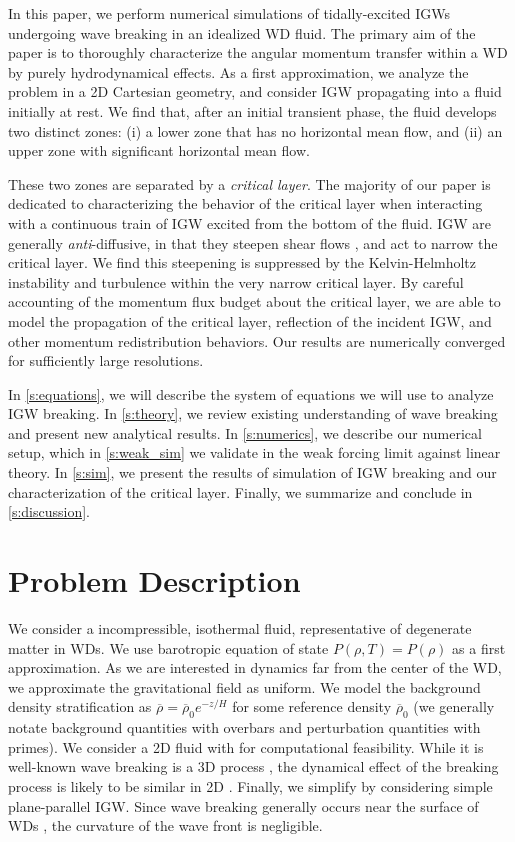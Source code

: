 \documentclass[
        fleqn,
        usenatbib,
        referee,
    ]{mnras}
\begin{document}
In this paper, we perform numerical simulations of tidally-excited IGWs
undergoing wave breaking in an idealized WD fluid. The primary aim of the paper
is to thoroughly characterize the angular momentum transfer within a WD by
purely hydrodynamical effects. As a first approximation, we analyze the problem
in a 2D Cartesian geometry, and consider IGW propagating into a fluid initially
at rest. We find that, after an initial transient phase, the fluid develops two
distinct zones: (i) a lower zone that has no horizontal mean flow, and (ii) an
upper zone with significant horizontal mean flow.

These two zones are separated by a \emph{critical layer}. The majority of our
paper is dedicated to characterizing the behavior of the critical layer when
interacting with a continuous train of IGW excited from the bottom of the fluid.
IGW are generally \emph{anti}-diffusive, in that they steepen shear flows
\citep{lindzen_qbo,lecoanet_meanflow}, and act to narrow the critical layer. We
find this steepening is suppressed by the Kelvin-Helmholtz instability and
turbulence within the very narrow critical layer. By careful accounting of the
momentum flux budget about the critical layer, we are able to model the
propagation of the critical layer, reflection of the incident IGW, and other
momentum redistribution behaviors. Our results are numerically converged
for sufficiently large resolutions.

In \autoref{s:equations}, we will describe the system of equations we will use
to analyze IGW breaking. In \autoref{s:theory}, we review existing understanding
of wave breaking and present new analytical results. In \autoref{s:numerics}, we
describe our numerical setup, which in \autoref{s:weak_sim} we validate in the
weak forcing limit against linear theory. In \autoref{s:sim}, we present the
results of simulation of IGW breaking and our characterization of the critical
layer. Finally, we summarize and conclude in \autoref{s:discussion}.

\section{Problem Description}\label{s:equations}

We consider a incompressible, isothermal fluid, representative of degenerate
matter in WDs. We use barotropic equation of state $P(\rho, T) = P(\rho)$ as a
first approximation. As we are interested in dynamics far from the center of the
WD, we approximate the gravitational field as uniform. We model the background
density stratification as $\overline{\rho} = \overline{\rho}_0 e^{-z/H}$ for
some reference density $\overline{\rho}_0$ (we generally notate background
quantities with overbars and perturbation quantities with primes). We
consider a 2D fluid with for computational feasibility. While
it is well-known wave breaking is a 3D process \citep{klostermeyer,winters1994},
the dynamical effect of the breaking process is likely to be similar in 2D
\citep{barker_ogilvie}. Finally, we simplify by considering simple
plane-parallel IGW\@. Since wave breaking generally occurs near the surface of
WDs \citep[$\gtrsim 0.9R_{WD}$][]{fullerI}, the curvature of the wave front is
negligible.
\end{document}

